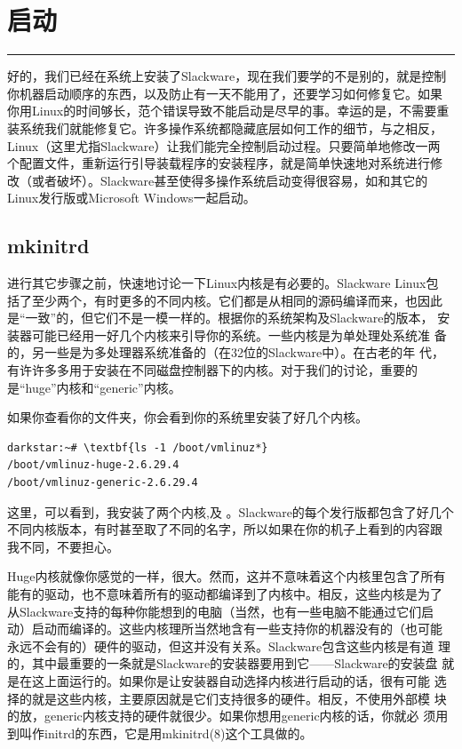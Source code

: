 
\chapter{启动}
\label{chap:booting}

\begin{flushleft}
\rule[0mm]{\textwidth}{.1pt}
\end{flushleft}

好的，我们已经在系统上安装了Slackware，现在我们要学的不是别的，就是控制
你机器启动顺序的东西，以及防止有一天不能用了，还要学习如何修复它。如果
你用Linux的时间够长，范个错误导致不能启动是尽早的事。幸运的是，不需要重
装系统我们就能修复它。许多操作系统都隐藏底层如何工作的细节，与之相反，
Linux（这里尤指Slackware）让我们能完全控制启动过程。只要简单地修改一两
个配置文件，重新运行引导装载程序的安装程序，就是简单快速地对系统进行修
改（或者破坏）。Slackware甚至使得多操作系统启动变得很容易，如和其它的
Linux发行版或Microsoft Windows一起启动。

\section{mkinitrd}
\label{sec:booting:mkinitrd}

进行其它步骤之前，快速地讨论一下Linux内核是有必要的。Slackware Linux包
括了至少两个，有时更多的不同内核。它们都是从相同的源码编译而来，也因此
是``一致''的，但它们不是一模一样的。根据你的系统架构及Slackware的版本，
安装器可能已经用一好几个内核来引导你的系统。一些内核是为单处理处系统准
备的，另一些是为多处理器系统准备的（在32位的Slackware中）。在古老的年
代，有许许多多用于安装在不同磁盘控制器下的内核。对于我们的讨论，重要的
是``huge''内核和``generic''内核。

如果你查看你的文件夹，你会看到你的系统里安装了好几个内核。
\begin{Verbatim}[frame=single,commandchars=\\\{\}]
darkstar:~# \textbf{ls -1 /boot/vmlinuz*}
/boot/vmlinuz-huge-2.6.29.4
/boot/vmlinuz-generic-2.6.29.4
\end{Verbatim}
这里，可以看到，我安装了两个内核,及
。Slackware的每个发行版都包含了好几个
不同内核版本，有时甚至取了不同的名字，所以如果在你的机子上看到的内容跟
我不同，不要担心。

Huge内核就像你感觉的一样，很大。然而，这并不意味着这个内核里包含了所有
能有的驱动，也不意味着所有的驱动都编译到了内核中。相反，这些内核是为了
从Slackware支持的每种你能想到的电脑（当然，也有一些电脑不能通过它们启
动）启动而编译的。这些内核理所当然地含有一些支持你的机器没有的（也可能
永远不会有的）硬件的驱动，但这并没有关系。Slackware包含这些内核是有道
理的，其中最重要的一条就是Slackware的安装器要用到它——Slackware的安装盘
就是在这上面运行的。如果你是让安装器自动选择内核进行启动的话，很有可能
选择的就是这些内核，主要原因就是它们支持很多的硬件。相反，不使用外部模
块的放，generic内核支持的硬件就很少。如果你想用generic内核的话，你就必
须用到叫作initrd的东西，它是用mkinitrd(8)这个工具做的。

